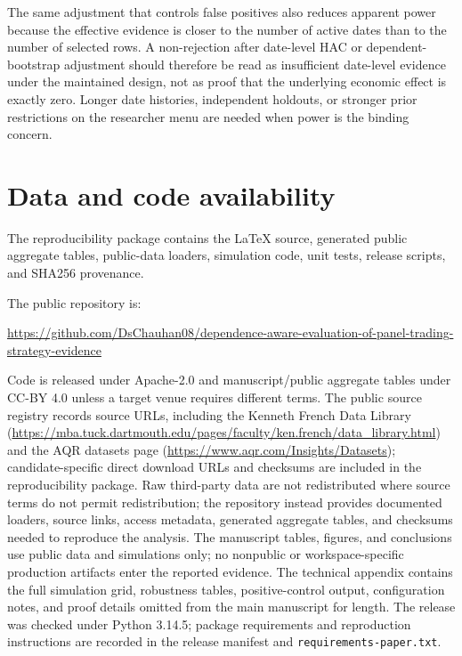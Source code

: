 \documentclass[12pt,a4paper]{article}
\newif\ifblinded
\begin{document}
The same adjustment that controls false positives also reduces apparent
power because the effective evidence is closer to the number of active
dates than to the number of selected rows.  A non-rejection after
date-level HAC or dependent-bootstrap adjustment should therefore be read
as insufficient date-level evidence under the maintained design, not as
proof that the underlying economic effect is exactly zero.  Longer
date histories, independent holdouts, or stronger prior restrictions on
the researcher menu are needed when power is the binding concern.

\section{Data and code availability}

The reproducibility package contains the LaTeX source, generated public
aggregate tables, public-data loaders, simulation code, unit tests,
release scripts, and SHA256 provenance.
\ifblinded
For double-blind review, the public repository URL is omitted from the
manuscript.  An anonymized reproducibility package is supplied
separately for refereeing; the public repository URL is provided on the
title page and will be inserted into the manuscript after review if
required.
\else
The public repository is:
{\scriptsize\noindent
\url{https://github.com/DsChauhan08/dependence-aware-evaluation-of-panel-trading-strategy-evidence}\par}
\fi
Code is released under Apache-2.0 and manuscript/public aggregate
tables under CC-BY 4.0 unless a target venue requires different terms.
The public source registry records source URLs, including the Kenneth
French Data Library
(\url{https://mba.tuck.dartmouth.edu/pages/faculty/ken.french/data_library.html})
and the AQR datasets page (\url{https://www.aqr.com/Insights/Datasets});
candidate-specific direct download URLs and checksums are included in
the reproducibility package.
Raw third-party data are not
redistributed where source terms do not permit redistribution; the
repository instead provides documented loaders, source links, access
metadata, generated aggregate tables, and checksums needed to
reproduce the analysis.  The manuscript tables, figures, and conclusions
use public data and simulations only; no nonpublic or workspace-specific
production artifacts enter the reported evidence.  The technical
appendix contains the full
simulation grid, robustness tables, positive-control output,
configuration notes, and proof details omitted from the main manuscript
for length.
The release was checked under Python 3.14.5; package requirements and
reproduction instructions are recorded in the release manifest and
\texttt{requirements-paper.txt}.
\end{document}

